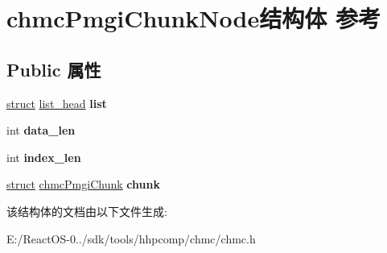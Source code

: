 \hypertarget{structchmc_pmgi_chunk_node}{}\section{chmc\+Pmgi\+Chunk\+Node结构体 参考}
\label{structchmc_pmgi_chunk_node}
\subsection*{Public 属性}
\begin{DoxyCompactItemize}
\item 
\mbox{\label{structchmc_pmgi_chunk_node_a012cbf0e45f45e8c9180bd76ae2bc25f}} 
\hyperlink{interfacestruct}{struct} \hyperlink{structlist__head}{list\+\_\+head} {\bfseries list}
\item 
\mbox{\label{structchmc_pmgi_chunk_node_af0ea09aef48c92a55e593e184e87c78e}} 
int {\bfseries data\+\_\+len}
\item 
\mbox{\label{structchmc_pmgi_chunk_node_ad3bd90af3cc1727db0dbb4e4d05439e5}} 
int {\bfseries index\+\_\+len}
\item 
\mbox{\label{structchmc_pmgi_chunk_node_a996413f89d096756157361be5735db2a}} 
\hyperlink{interfacestruct}{struct} \hyperlink{structchmc_pmgi_chunk}{chmc\+Pmgi\+Chunk} {\bfseries chunk}
\end{DoxyCompactItemize}


该结构体的文档由以下文件生成\+:\begin{DoxyCompactItemize}
\item 
E\+:/\+React\+O\+S-\/0../sdk/tools/hhpcomp/chmc/chmc.\+h\end{DoxyCompactItemize}
